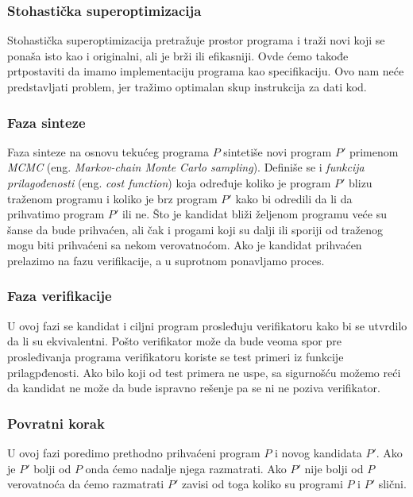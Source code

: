 \subsubsection{Stohastička superoptimizacija}
\label{subsec:StohastickaSuperoptimizacija}

Stohastička superoptimizacija pretražuje prostor programa i traži novi koji se ponaša isto kao i originalni, ali je brži ili efikasniji. Ovde ćemo takođe prtpostaviti da imamo implementaciju programa kao specifikaciju. Ovo nam neće predstavljati problem, jer tražimo optimalan skup instrukcija za dati kod.


\subsubsection{Faza sinteze}


Faza sinteze na osnovu tekućeg programa $P$ sintetiše novi program $P'$ primenom \emph{MCMC} (eng. \emph{Markov-chain Monte Carlo sampling}). Definiše se i \emph{funkcija prilagođenosti} (eng. \emph{cost function}) koja određuje koliko je program $P'$ blizu traženom programu i koliko je brz program $P'$ kako bi odredili da li da prihvatimo program $P'$ ili ne. Što je kandidat bliži željenom programu veće su šanse da bude prihvaćen, ali čak i progami koji su dalji ili sporiji od traženog mogu biti prihvaćeni sa nekom verovatnoćom. Ako je kandidat prihvaćen prelazimo na fazu verifikacije, a u suprotnom ponavljamo proces.


\subsubsection{Faza verifikacije}


U ovoj fazi se kandidat i ciljni program prosleđuju verifikatoru kako bi se utvrdilo da li su ekvivalentni. Pošto verifikator može da bude veoma spor pre prosleđivanja programa verifikatoru koriste se test primeri iz funkcije prilagpđenosti. Ako bilo koji od test primera ne uspe, sa sigurnošću možemo reći da kandidat ne može da bude ispravno rešenje pa se ni ne poziva verifikator.


\subsubsection{Povratni korak}

U ovoj fazi poredimo prethodno prihvaćeni program $P$ i novog kandidata $P'$. Ako je $P'$ bolji od $P$ onda ćemo nadalje njega razmatrati. Ako $P'$ nije bolji od $P$ verovatnoća da ćemo razmatrati $P'$ zavisi od toga koliko su programi $P$ i $P'$ slični.


